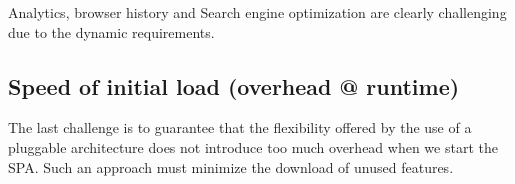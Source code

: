Analytics, browser history and Search engine optimization are clearly challenging due to the dynamic requirements.

\subsection{Speed of initial load (overhead @ runtime) }
The last challenge is to guarantee that the flexibility offered by the use of a pluggable architecture does not introduce too much overhead when we start the SPA. Such an approach must minimize the download of unused features.

